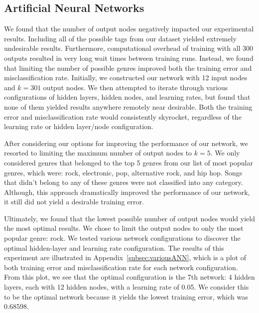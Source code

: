 \documentclass[12pt]{article}
\begin{document}
\subsection{Artificial Neural Networks}
\label{subsec:annResults}
We found that the number of output nodes negatively impacted our experimental results. Including all of the possible tags from our dataset yielded extremely undesirable results. Furthermore, computational overhead of training with all 300 outputs resulted in very long wait times between training runs. Instead, we found that limiting the number of possible genres improved both the training error and misclassification rate. Initially, we constructed our network with 12 input nodes and $k = 301$ output nodes. We then attempted to iterate through various configurations of hidden layers, hidden nodes, and learning rates, but found that none of them yielded results anywhere remotely near desirable. Both the training error and misclassification rate would consistently skyrocket, regardless of the learning rate or hidden layer/node configuration.

After considering our options for improving the performance of our network, we resorted to limiting the maximum number of output nodes to $k = 5$. We only considered genres that belonged to the top 5 genres from our list of most popular genres, which were: rock, electronic, pop, alternative rock, and hip hop. Songs that didn't belong to any of these genres were not classified into any category. Although, this approach dramatically improved the performance of our network, it still did not yield a desirable training error.

Ultimately, we found that the lowest possible number of output nodes would yield the most optimal results. We chose to limit the output nodes to only the most popular genre: rock. We tested various network configurations to discover the optimal hidden-layer and learning rate configuration. The results of this experiment are illustrated in Appendix~\ref{subsec:variousANN}, which is a plot of both training error and misclassification rate for each network configuration. From this plot, we see that the optimal configuration is the 7th network: 4 hidden layers, each with 12 hidden nodes, with a learning rate of 0.05. We consider this to be the optimal network because it yields the lowest training error, which was 0.68598.
\end{document}
